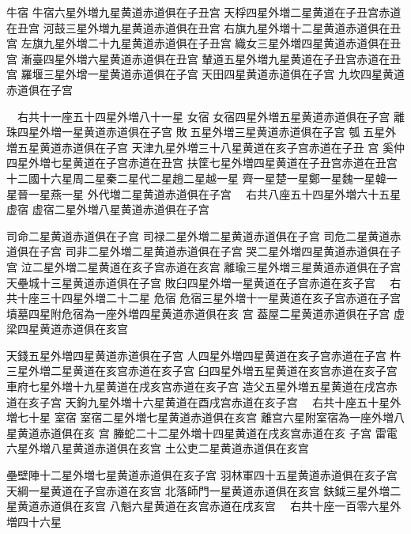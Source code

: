 \begin{正文}
牛宿
牛宿六星外増九星黄道赤道俱在子丑宫
天桴四星外増二星黄道在子丑宫赤道在丑宫
河鼓三星外増九星黄道赤道俱在丑宫
右旗九星外増十二星黄道赤道俱在丑宫
左旗九星外増二十九星黄道赤道俱在子丑宫
織女三星外増四星黄道赤道俱在丑宫
漸臺四星外増六星黄道赤道俱在丑宫
輦道五星外増九星黄道在子丑宫赤道在丑宫
羅堰三星外增一星黄道赤道俱在子宫
天田四星黄道赤道俱在子宫
九坎四星黄道赤道俱在子宫
\par
　右共十一座五十四星外増八十一星
女宿
女宿四星外増五星黄道赤道俱在子宫
離珠四星外増一星黄道赤道俱在子宫
敗𤓰五星外増三星黄道赤道俱在子宫
瓠𤓰五星外増五星黄道赤道俱在子宫
天津九星外増三十八星黄道在亥子宫赤道在子丑
宫
奚仲四星外増七星黄道在子宫赤道在丑宫
扶筐七星外増四星黄道在子丑宫赤道在丑宫
十二國十六星周二星秦二星代二星趙二星越一星
齊一星楚一星鄭一星魏一星韓一星晉一星燕一星
外代増二星黄道赤道俱在子宫
　右共八座五十四星外増六十五星
虚宿
虚宿二星外増八星黄道赤道俱在子宫
\par
司命二星黄道赤道俱在子宫
司禄二星外増二星黄道赤道俱在子宫
司危二星黄道赤道俱在子宫
司非二星外増二星黄道赤道俱在子宫
哭二星外増四星黄道赤道俱在子宫
泣二星外増二星黄道在亥子宫赤道在亥宫
離瑜三星外増三星黄道赤道俱在子宫
天壘城十三星黄道赤道俱在子宫
敗臼四星外増一星黄道在子宫赤道在亥子宫
　右共十座三十四星外増二十二星
危宿
危宿三星外増十一星黄道在亥子宫赤道在子宫
墳墓四星附危宿為一座外増四星黄道赤道俱在亥
宫
葢屋二星黄道赤道俱在子宫
虚梁四星黄道赤道俱在亥宫
\par
天錢五星外増四星黄道赤道俱在子宫
人四星外増四星黄道在亥子宫赤道在子宫
杵三星外増二星黄道在亥宫赤道在亥子宫
臼四星外増五星黄道在亥宫赤道在亥子宫
車府七星外増十九星黄道在戌亥宫赤道在亥子宫
造父五星外増五星黄道在戌宫赤道在亥子宫
天鉤九星外増十六星黄道在酉戌宫赤道在亥子宫
　右共十座五十星外増七十星
室宿
室宿二星外増七星黄道赤道俱在亥宫
離宫六星附室宿為一座外増八星黄道赤道俱在亥
宫
螣蛇二十二星外増十四星黄道在戌亥宫赤道在亥
子宫
雷電六星外増八星黄道赤道俱在亥宫
土公吏二星黄道赤道俱在亥宫
\par
壘壁陣十二星外増七星黄道赤道俱在亥子宫
羽林軍四十五星黄道赤道俱在亥子宫
天綱一星黄道在子宫赤道在亥宫
北落師門一星黄道赤道俱在亥宫
鈇鉞三星外増二星黄道赤道俱在亥宫
八魁六星黄道在亥宫赤道在戌亥宫
　右共十座一百零六星外増四十六星

\end{正文}
